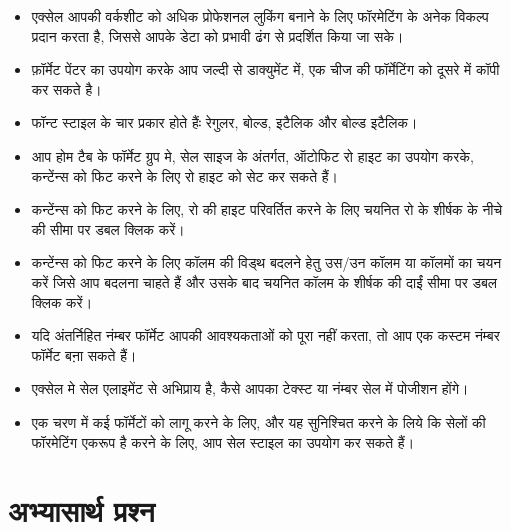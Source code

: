 \begin{itemize}[topsep=-1ex,parsep=0ex,partopsep=0ex,itemsep=0.4ex]
\item एक्सेल आपकी वर्कशीट को अधिक प्रोफेशनल लुकिंग बनाने के लिए फॉरमेटिंग के अनेक विकल्प प्रदान करता है, जिससे आपके डेटा को प्रभावी ढंग से प्रदर्शित किया जा सके।
\item फ़ॉर्मेट पेंटर का उपयोग करके आप जल्दी से डाक्युमेंट में, एक चीज की फॉर्मेटिंग को दूसरे में कॉपी कर सकते है।
\item फॉन्ट स्टाइल के चार प्रकार होते हैंः रेगुलर, बोल्ड, इटैलिक और बोल्ड इटैलिक।
\item आप होम टैब के फॉर्मेट ग्रुप मे, सेल साइज के अंतर्गत, ऑटोफिट रो हाइट का उपयोग करके, कन्टेंन्स को फिट करने के लिए रो हाइट को सेट कर सकते हैं।
\item कन्टेंन्स को फिट करने के लिए, रो की हाइट परिवर्तित करने के लिए चयनित रो के शीर्षक के नीचे की सीमा पर डबल क्लिक करें।
\item कन्टेंन्स को फिट करने के लिए कॉलम की विड्थ बदलने हेतु उस/उन कॉलम या कॉलमों का चयन करें जिसे आप बदलना चाहते हैं और उसके बाद चयनित कॉलम के शीर्षक की दाईं सीमा पर डबल क्लिक करें।
\item यदि अंतर्निहित नंम्बर फॉर्मेट आपकी आवश्यकताओं को पूरा नहीं करता, तो आप एक कस्टम नंम्बर फॉर्मेट बना़ सकते हैं।
\item एक्सेल मे सेल एलाइमेंट से अभिप्राय है, कैसे आपका टेक्स्ट या नंम्बर सेल में पोजीशन होंगे।
\item एक चरण में कई फॉर्मेटों को लागू करने के लिए, और यह सुनिश्चित करने के लिये कि सेलों की फॉरमेटिंग एकरूप है करने के लिए, आप सेल स्टाइल का उपयोग कर सकते हैं।
\end{itemize}
\section*{अभ्यासार्थ प्रश्न}

